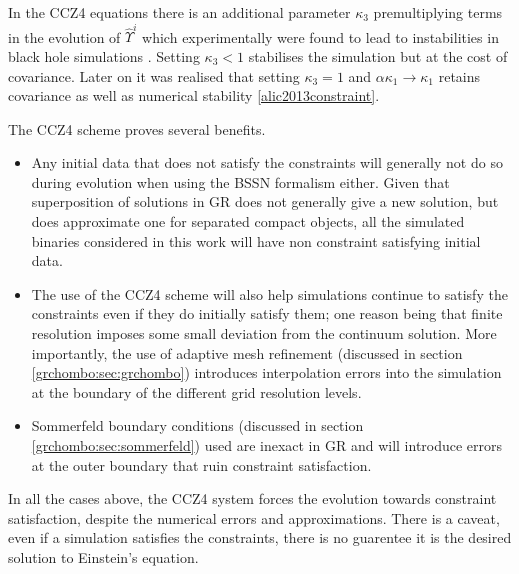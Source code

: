 In the CCZ4 equations there is an additional parameter $\kappa_3$ premultiplying terms in the evolution of $\hat{\Upsilon}^i$ which experimentally were found to lead to instabilities in black hole simulations \cite{PhysRevD.85.064040}. Setting $\kappa_3<1$ stabilises the simulation but at the cost of covariance. Later on it was realised that setting $\kappa_3=1$ and $\alpha\kappa_1\rightarrow\kappa_1$ retains covariance as well as numerical stability \ref{alic2013constraint}.


The CCZ4 scheme proves several benefits. 
\begin{itemize}
\item Any initial data that does not satisfy the constraints will generally not do so during evolution when using the BSSN formalism either. Given that superposition of solutions in GR does not generally give a new solution, but does approximate one for separated compact objects, all the simulated binaries considered in this work will have non constraint satisfying initial data. 
\item The use of the CCZ4 scheme will also help simulations continue to satisfy the constraints even if they do initially satisfy them; one reason being that finite resolution imposes some small deviation from the continuum solution. More importantly, the use of adaptive mesh refinement (discussed in section \ref{grchombo:sec:grchombo}) introduces interpolation errors into the simulation at the boundary of the different grid resolution levels. 
\item Sommerfeld boundary conditions (discussed in section \ref{grchombo:sec:sommerfeld}) used are inexact in GR and will introduce errors at the outer boundary that ruin constraint satisfaction. 
\end{itemize}
In all the cases above, the CCZ4 system forces the evolution towards constraint satisfaction, despite the numerical errors and approximations. There is a caveat, even if a simulation satisfies the constraints, there is no guarentee it is the desired solution to Einstein's equation. 

